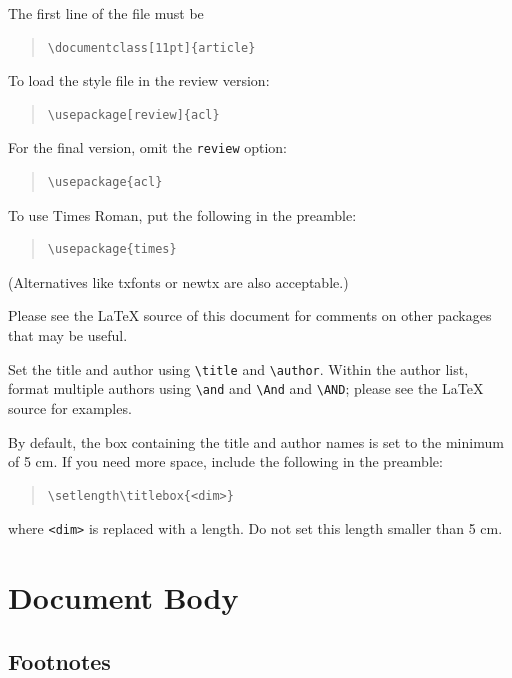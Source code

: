 \documentclass[11pt]{article}
\begin{document}
The first line of the file must be
\begin{quote}
\begin{verbatim}
\documentclass[11pt]{article}
\end{verbatim}
\end{quote}

To load the style file in the review version:
\begin{quote}
\begin{verbatim}
\usepackage[review]{acl}
\end{verbatim}
\end{quote}
For the final version, omit the \verb|review| option:
\begin{quote}
\begin{verbatim}
\usepackage{acl}
\end{verbatim}
\end{quote}

To use Times Roman, put the following in the preamble:
\begin{quote}
\begin{verbatim}
\usepackage{times}
\end{verbatim}
\end{quote}
(Alternatives like txfonts or newtx are also acceptable.)

Please see the \LaTeX{} source of this document for comments on other packages that may be useful.

Set the title and author using \verb|\title| and \verb|\author|. Within the author list, format multiple authors using \verb|\and| and \verb|\And| and \verb|\AND|; please see the \LaTeX{} source for examples.

By default, the box containing the title and author names is set to the minimum of 5 cm. If you need more space, include the following in the preamble:
\begin{quote}
\begin{verbatim}
\setlength\titlebox{<dim>}
\end{verbatim}
\end{quote}
where \verb|<dim>| is replaced with a length. Do not set this length smaller than 5 cm.

\section{Document Body}

\subsection{Footnotes}
\end{document}

